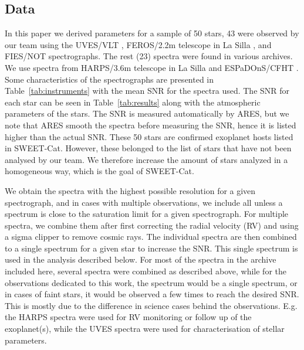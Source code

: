 \documentclass{aa}
\begin{document}
\subsection{Data}
\label{sec:data}
In this paper we derived parameters for a sample of 50 stars, 43 were observed
by our team using the UVES/VLT \citep{UVES}, FEROS/2.2m telescope in La Silla
\citep{FEROS}, and FIES/NOT \citep{FIES} spectrographs. The rest (23) spectra
were found in various archives. We use spectra from HARPS/3.6m telescope in La
Silla \citep{HARPS} and ESPaDOnS/CFHT \citep{ESPADONS}. Some characteristics of
the spectrographs are presented in Table~\ref{tab:instruments} with the mean SNR
for the spectra used. The SNR for each star can be seen in
Table~\ref{tab:results} along with the atmospheric parameters of the stars. The
SNR is measured automatically by ARES, but we note that ARES smooth the spectra
before measuring the SNR, hence it is listed higher than the actual SNR. These
50 stars are confirmed exoplanet hosts listed in SWEET-Cat. However, these
belonged to the list of stars that have not been analysed by our team. We
therefore increase the amount of stars analyzed in a homogeneous way, which is
the goal of SWEET-Cat.

We obtain the spectra with the highest possible resolution for a given
spectrograph, and in cases with multiple observations, we include all unless a
spectrum is close to the saturation limit for a given spectrograph. For multiple
spectra, we combine them after first correcting the radial velocity (RV) and
using a sigma clipper to remove cosmic rays. The individual spectra are then
combined to a single spectrum for a given star to increase the SNR. This single
spectrum is used in the analysis described below. For most of the spectra in the
archive included here, several spectra were combined as described above, while
for the observations dedicated to this work, the spectrum would be a single
spectrum, or in cases of faint stars, it would be observed a few times to reach
the desired SNR. This is mostly due to the difference in science cases behind
the observations. E.g. the HARPS spectra were used for RV monitoring or follow
up of the exoplanet(s), while the UVES spectra were used for characterisation of
stellar parameters.
\end{document}
